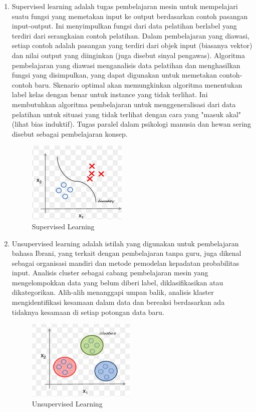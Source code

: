 \begin{enumerate}

\item Supervised learning adalah tugas pembelajaran mesin untuk mempelajari suatu fungsi yang memetakan input ke output berdasarkan contoh pasangan input-output. Ini menyimpulkan fungsi dari data pelatihan berlabel yang terdiri dari serangkaian contoh pelatihan. Dalam pembelajaran yang diawasi, setiap contoh adalah pasangan yang terdiri dari objek input (biasanya vektor) dan nilai output yang diinginkan (juga disebut sinyal pengawas). Algoritma pembelajaran yang diawasi menganalisis data pelatihan dan menghasilkan fungsi yang disimpulkan, yang dapat digunakan untuk memetakan contoh-contoh baru. Skenario optimal akan memungkinkan algoritma menentukan label kelas dengan benar untuk instance yang tidak terlihat. Ini membutuhkan algoritma pembelajaran untuk menggeneralisasi dari data pelatihan untuk situasi yang tidak terlihat dengan cara yang "masuk akal" (lihat bias induktif). Tugas paralel dalam psikologi manusia dan hewan sering disebut sebagai pembelajaran konsep.

\begin{figure}[ht]
\centering
\includegraphics[scale=0.5]{figures/f2.jpg}
\caption{Supervised Learning}
\label{contoh}
\end{figure}

\item Unsupervised learning adalah istilah yang digunakan untuk pembelajaran bahasa Ibrani, yang terkait dengan pembelajaran tanpa guru, juga dikenal sebagai organisasi mandiri dan metode pemodelan kepadatan probabilitas input. Analisis cluster sebagai cabang pembelajaran mesin yang mengelompokkan data yang belum diberi label, diklasifikasikan atau dikategorikan. Alih-alih menanggapi umpan balik, analisis klaster mengidentifikasi kesamaan dalam data dan bereaksi berdasarkan ada tidaknya kesamaan di setiap potongan data baru.

\begin{figure}[ht]
\centering
\includegraphics[scale=0.5]{figures/f3.jpg}
\caption{Unsupervised Learning}
\label{contoh}
\end{figure}


\end{enumerate}
